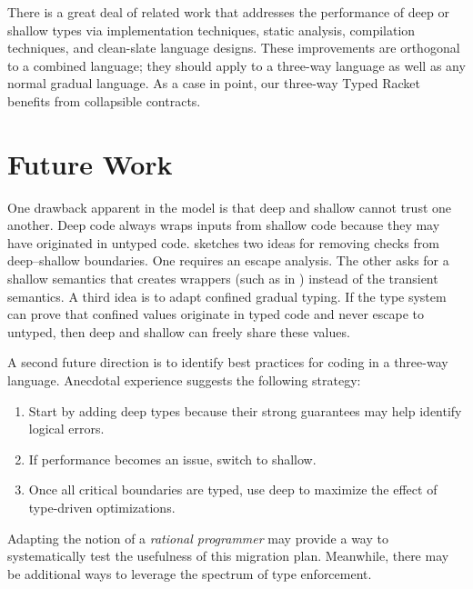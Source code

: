 \documentclass[screen=true, natbib=false, 10pt, sigplan]{acmart}
\newcommand{\sectionNewpage}{}
\newlength{\stabLeft}
\newcommand{\atItemizeStart}[0]{\addtolength{\stabLeft}{\labelsep}
                                \addtolength{\stabLeft}{\labelwidth}}
\let\SOriginalthesubsection\thesubsection
\newcommand{\Ssection}[2]{\section[#1]{#2}\let\thesubsection\SOriginalthesubsection}
\begin{document}
There is a great deal of related work that addresses the performance of
deep or shallow types via implementation techniques,
static analysis,
compilation techniques,
and clean{-}slate language designs.
These improvements are orthogonal to a combined language; they should
apply to a three{-}way language as well as any normal gradual language.
As a case in point, our three{-}way Typed Racket
benefits from collapsible contracts.

\sectionNewpage

\Ssection{Future Work}{Future Work}\label{t:x28part_x22secx3afuturex22x29}

One drawback apparent in the model is that deep and shallow cannot
trust one another.
Deep code always wraps inputs from shallow code because they may have
originated in untyped code.
 sketches two ideas for removing checks from
deep{--}shallow boundaries.
One requires an escape analysis.
The other asks for a shallow semantics that creates wrappers
(such as in )
instead of the transient semantics.
A third idea is to adapt confined gradual typing.
If the type system can prove that confined values originate in typed code and
never escape to untyped, then deep and shallow can freely share these
values.

A second future direction is to identify best practices for coding in
a three{-}way language.
Anecdotal experience suggests the following strategy:


\noindent \begin{enumerate}\atItemizeStart

\item Start by adding deep types because their strong guarantees may help
identify logical errors.

\item If performance becomes an issue, switch to shallow.

\item Once all critical boundaries are typed, use deep to maximize
the effect of type{-}driven optimizations.\end{enumerate}

\noindent \noindent{}Adapting the notion of a \emph{rational
programmer} may provide a way to systematically test the
usefulness of this migration plan.
Meanwhile, there may be additional ways to leverage the spectrum of type
enforcement.
\end{document}
